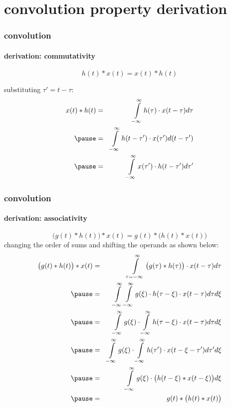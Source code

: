 \section[deriv]{convolution property derivation}

\begin{frame}\frametitle{convolution}\framesubtitle{derivation: commutativity}
\begin{footnotesize}
		\begin{equation*}
			h(t) \ast x(t)	= x(t) \ast h(t) 
		\end{equation*}
		
        \bigskip
        substituting $\tau'=t-\tau$:
		\begin{eqnarray*}
			x(t) \ast h(t)
					&=& \int\limits_{-\infty}^{\infty}{h(\tau)\cdot x(t-\tau)} d\tau\nonumber\\
                    \pause&=& \int\limits_{-\infty}^{\infty}{h(t-\tau')\cdot x(\tau')}d(t-\tau') \nonumber\\
					\pause&=& \int\limits_{-\infty}^{\infty}{x(\tau')\cdot h(t-\tau')}d\tau' 
		\end{eqnarray*}
\end{footnotesize}
\end{frame}	

\begin{frame}\frametitle{convolution}\framesubtitle{derivation: associativity}
\vspace{-6mm}
\begin{footnotesize}
		\begin{equation*}
			\big(g(t) \ast h(t)\big) \ast x(t) = g(t) \ast \big(h(t) \ast x(t)\big)
		\end{equation*}
		changing the order of sums and shifting the operands as shown below:
		\begin{eqnarray*}
			\big(g(t) \ast h(t)\big) \ast x(t)	&=& \int\limits_{\tau=-\infty}^{\infty}{\big(g(\tau) \ast h(\tau)\big)\cdot x(t-\tau)}d\tau\nonumber\\
												\pause&=& \int\limits_{-\infty}^{\infty}{\int\limits_{-\infty}^{\infty}{g(\xi)\cdot h(\tau-\xi)}\cdot x(t-\tau)}d\tau d\xi\nonumber\\
												\pause&=& \int\limits_{-\infty}^{\infty}{g(\xi)\cdot \int\limits_{-\infty}^{\infty}{h(\tau-\xi)}\cdot x(t-\tau)}d\tau d\xi\nonumber\\
												\pause&=& \int\limits_{-\infty}^{\infty}{g(\xi)\cdot \int\limits_{-\infty}^{\infty}{h(\tau')}\cdot x(t-\xi-\tau')d\tau' d\xi}\nonumber\\
												\pause&=& \int\limits_{-\infty}^{\infty}{g(\xi)\cdot  \big(h(t-\xi) \ast x(t-\xi)\big)} d\xi\nonumber\\
												\pause&=& g(t) \ast \big(h(t) \ast x(t)\big) 
		\end{eqnarray*}
\end{footnotesize}
\end{frame}	

